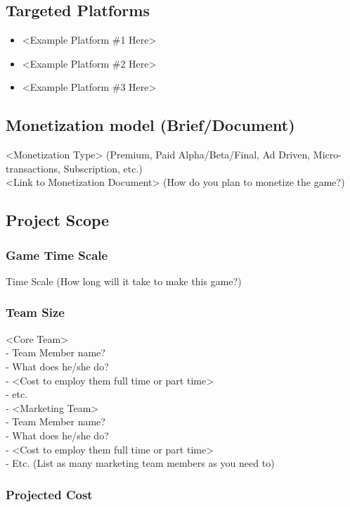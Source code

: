 \documentclass[14pt]{article}
\begin{document}
\subsection{Targeted Platforms}
\begin{itemize}
    \item <Example Platform \#1 Here>
    \item <Example Platform \#2 Here>
    \item <Example Platform \#3 Here>
\end{itemize}

\subsection{Monetization model (Brief/Document)}
<Monetization Type> (Premium, Paid Alpha/Beta/Final, Ad Driven, Micro-transactions, Subscription, etc.) \\
<Link to Monetization Document> 
(How do you plan to monetize the game?)

\subsection{Project Scope}
\subsubsection{Game Time Scale}
Time Scale (How long will it take to make this game?)

\subsubsection{Team Size}
<Core Team> \\
\hspace{1mm}		- Team Member name? \\
			- What does he/she do? \\
			- <Cost to employ them full time or part time> \\
		- etc. \\
- <Marketing Team> \\
		- Team Member name? \\ 
			- What does he/she do? \\
			- <Cost to employ them full time or part time> \\
		- Etc.
(List as many marketing team members as you need to)

\subsubsection{Projected Cost}
\end{document}
